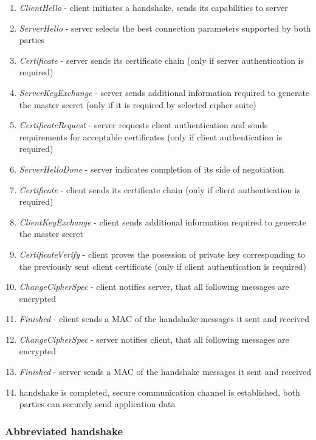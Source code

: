 \begin{enumerate}
  \item \textit{ClientHello} - client initiates a handshake, sends its capabilities to server
  \item \textit{ServerHello} - server selects the best connection parameters supported by both parties
  \item \textit{Certificate} - server sends its certificate chain (only if server authentication is required)
  \item \textit{ServerKeyExchange} - server sends additional information required to generate the master secret (only if it is required by selected cipher suite)
  \item \textit{CertificateRequest} - server requests client authentication and sends requirements for acceptable certificates (only if client authentication is required)
  \item \textit{ServerHelloDone} - server indicates completion of its side of negotiation
  \item \textit{Certificate} - client sends its certificate chain (only if client authentication is required)
  \item \textit{ClientKeyExchange} - client sends additional information required to generate the master secret
  \item \textit{CertificateVerify} - client proves the posession of private key corresponding to the previously sent client certificate (only if client authentication is required)
  \item \textit{ChangeCipherSpec} - client notifies server, that all following messages are encrypted
  \item \textit{Finished} - client sends a MAC of the handshake messages it sent and received
  \item \textit{ChangeCipherSpec} - server notifies client, that all following messages are encrypted
  \item \textit{Finished} - server sends a MAC of the handshake messages it sent and received
  \item handshake is completed, secure communication channel is established, both parties can securely send application data
\end{enumerate}

\subsubsection{Abbreviated handshake}

